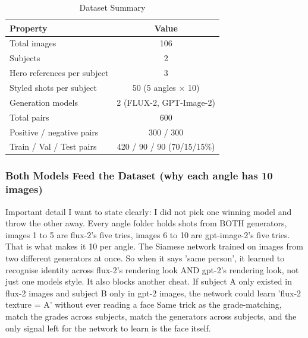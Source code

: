 \documentclass[conference]{IEEEtran}
\begin{document}
\begin{table}[h]
\caption{Dataset Summary}
\label{tab:dataset}
\centering
\begin{tabular}{lc}
\toprule
\textbf{Property} & \textbf{Value} \\
\midrule
Total images & 106 \\
Subjects & 2 \\
Hero references per subject & 3 \\
Styled shots per subject & 50 (5 angles $\times$ 10) \\
Generation models & 2 (FLUX-2, GPT-Image-2) \\
Total pairs & 600 \\
Positive / negative pairs & 300 / 300 \\
Train / Val / Test pairs & 420 / 90 / 90 (70/15/15\%) \\
\bottomrule
\end{tabular}
\end{table}

\subsubsection{Both Models Feed the Dataset (why each angle has 10 images)}
Important detail I want to state clearly: I did not pick one winning model and throw the other away. Every angle folder holds shots from BOTH generators, images 1 to 5 are flux-2's five tries, images 6 to 10 are gpt-image-2's five tries. That is what makes it 10 per angle. The Siamese network trained on images from two different generators at once. So when it says 'same person', it learned to recognise identity across flux-2's rendering look AND gpt-2's rendering look, not just one models style. It also blocks another cheat. If subject A only existed in flux-2 images and subject B only in gpt-2 images, the network could learn 'flux-2 texture = A' without ever reading a face
Same trick as the grade-matching, match the grades across subjects, match the generators across subjects, and the only signal left for the network to learn is the face itself.
\end{document}
